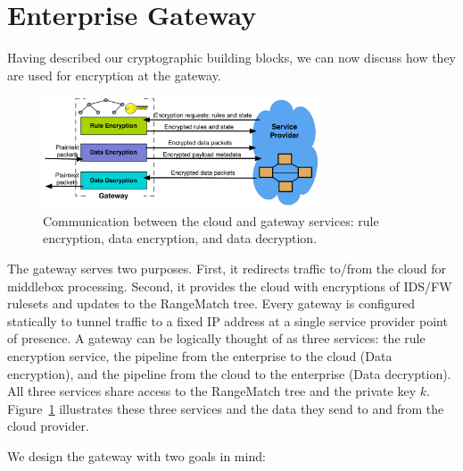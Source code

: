 \section{Enterprise Gateway}

\label{sec:gateway}
Having described our cryptographic building blocks, we can now discuss how they are used for encryption at the gateway.

\begin{figure}[t]
  \centering
  \includegraphics[width=3.25in]{fig/gateway2cloud}
  \caption[]{\label{fig:gatewaymeta} Communication between the cloud and gateway services: rule encryption, data encryption, and data decryption.} 
\end{figure}



The gateway serves two purposes. First, it redirects traffic to/from the cloud for middlebox processing. Second, it provides the cloud with encryptions of IDS/FW rulesets and updates to the RangeMatch tree.
Every gateway is configured statically to tunnel traffic to a fixed IP address at a single service provider point of presence.
A gateway can be logically thought of as three services: the rule encryption service, the pipeline from the enterprise to the cloud (Data encryption), and the pipeline from the cloud to the enterprise (Data decryption). 
All three services share access to the RangeMatch tree and the private key $k$.
Figure~\ref{fig:gatewaymeta} illustrates  these three services and the data they send to and from the cloud provider.

We design the gateway with two goals in mind: 

